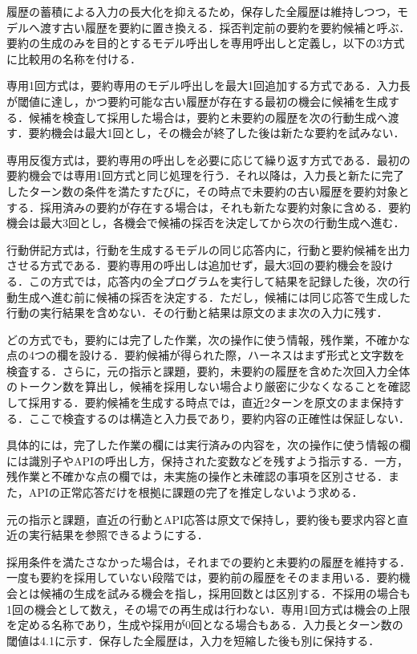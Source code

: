 \documentclass[letter]{ieicej}
\begin{document}
履歴の蓄積による入力の長大化を抑えるため，保存した全履歴は維持しつつ，モデルへ渡す古い履歴を要約に置き換える．採否判定前の要約を要約候補と呼ぶ．要約の生成のみを目的とするモデル呼出しを専用呼出しと定義し，以下の3方式に比較用の名称を付ける．

専用1回方式は，要約専用のモデル呼出しを最大1回追加する方式である．入力長が閾値に達し，かつ要約可能な古い履歴が存在する最初の機会に候補を生成する．候補を検査して採用した場合は，要約と未要約の履歴を次の行動生成へ渡す．要約機会は最大1回とし，その機会が終了した後は新たな要約を試みない．

専用反復方式は，要約専用の呼出しを必要に応じて繰り返す方式である．最初の要約機会では専用1回方式と同じ処理を行う．それ以降は，入力長と新たに完了したターン数の条件を満たすたびに，その時点で未要約の古い履歴を要約対象とする．採用済みの要約が存在する場合は，それも新たな要約対象に含める．要約機会は最大3回とし，各機会で候補の採否を決定してから次の行動生成へ進む．

行動併記方式は，行動を生成するモデルの同じ応答内に，行動と要約候補を出力させる方式である．要約専用の呼出しは追加せず，最大3回の要約機会を設ける．この方式では，応答内の全プログラムを実行して結果を記録した後，次の行動生成へ進む前に候補の採否を決定する．ただし，候補には同じ応答で生成した行動の実行結果を含めない．その行動と結果は原文のまま次の入力に残す．

どの方式でも，要約には完了した作業，次の操作に使う情報，残作業，不確かな点の4つの欄を設ける．要約候補が得られた際，ハーネスはまず形式と文字数を検査する．さらに，元の指示と課題，要約，未要約の履歴を含めた次回入力全体のトークン数を算出し，候補を採用しない場合より厳密に少なくなることを確認して採用する．要約候補を生成する時点では，直近2ターンを原文のまま保持する．ここで検査するのは構造と入力長であり，要約内容の正確性は保証しない．

具体的には，完了した作業の欄には実行済みの内容を，次の操作に使う情報の欄には識別子やAPIの呼出し方，保持された変数などを残すよう指示する．一方，残作業と不確かな点の欄では，未実施の操作と未確認の事項を区別させる．また，APIの正常応答だけを根拠に課題の完了を推定しないよう求める．

元の指示と課題，直近の行動とAPI応答は原文で保持し，要約後も要求内容と直近の実行結果を参照できるようにする．

採用条件を満たさなかった場合は，それまでの要約と未要約の履歴を維持する．一度も要約を採用していない段階では，要約前の履歴をそのまま用いる．要約機会とは候補の生成を試みる機会を指し，採用回数とは区別する．不採用の場合も1回の機会として数え，その場での再生成は行わない．専用1回方式は機会の上限を定める名称であり，生成や採用が0回となる場合もある．入力長とターン数の閾値は4.1に示す．保存した全履歴は，入力を短縮した後も別に保持する．
\end{document}
